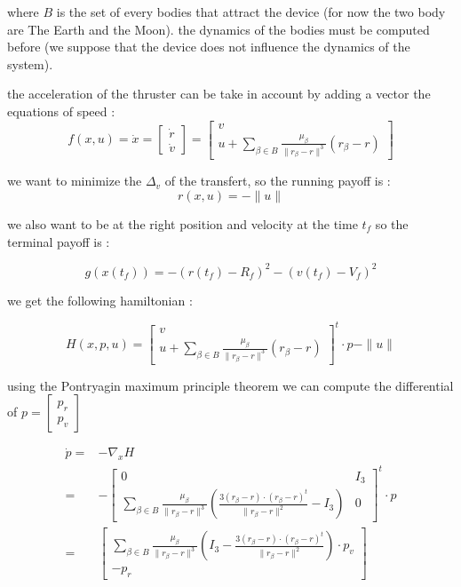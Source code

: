 \documentclass{article} %
\begin{document}
			where $B$ is the set of every bodies that attract the device (for now the two body are The Earth and the Moon). the dynamics of the bodies must be computed before (we suppose that the device does not influence the dynamics of the system).
			
			the acceleration of the thruster can be take in account by adding a vector the equations of speed : \\
			
			$$
			f(x,u)=\dot{x}=
			\begin{bmatrix}
				\dot{r}\\
				\dot{v}
			\end{bmatrix}
			=\begin{bmatrix}
				v\\
				u+\sum\limits _{\beta \in B }\frac{\mu _{\beta }}{\| r_{\beta } -r\| ^{3}}( r_{\beta } -r)
			\end{bmatrix}
			$$
			
			we want to minimize the $\Delta_v$ of the transfert, so the running payoff is :
			$$
			r(x,u)=-\|u\|
			$$ 
			
			we also want to be at the right position and velocity at the time $t_f$ so the terminal payoff is :
			
			$$
			g(x(t_f))=-(r(t_f)-R_f)^2-(v(t_f)-V_f)^2
			$$
			
			we get the following hamiltonian :
			
			$$
			H(x,p,u)=\begin{bmatrix}
				v\\
				u+\sum\limits _{\beta \in B }\frac{\mu _{\beta }}{\| r_{\beta } -r\| ^{3}}( r_{\beta } -r)
			\end{bmatrix}^t\cdot p-\|u\|
			$$
			
			using the Pontryagin maximum principle theorem we can compute the differential of $p=\begin{bmatrix}p_r\\p_v\end{bmatrix}$
			
			$$
			\begin{align}
				\dot{p}=&-\nabla _{x}H\\
				=&-\begin{bmatrix}
					0 & I_3\\
					\sum\limits _{\beta \in B }\frac{\mu _{\beta }}{\| r_{\beta } -r\| ^{3}}\left(\frac{3( r_{\beta } -r) \cdot ( r_{\beta } -r)^{t}}{\| r_{\beta } -r\| ^{2}} -I_3\right) & 0
				\end{bmatrix}^{t} \cdot p\\
				=&\begin{bmatrix}
					\sum\limits _{\beta \in B }\frac{\mu _{\beta }}{\| r_{\beta } -r\| ^{3}}\left(I_3-\frac{3( r_{\beta } -r) \cdot ( r_{\beta } -r)^{t}}{\| r_{\beta } -r\| ^{2}} \right)\cdot p_v\\
					-p_r
				\end{bmatrix}
			\end{align}
			$$
			
\end{document}
